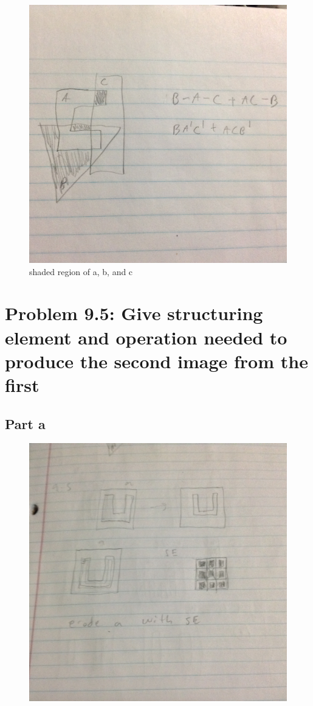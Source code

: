 \documentclass{article}
\begin{document}
	\begin{figure}[H]
		\includegraphics[width=\linewidth]{2.23/fig5.JPG}
		\caption{shaded region of a, b, and c}
	\end{figure}
	
	\newpage
	\section{Problem 9.5: Give structuring element and operation needed to produce the second image from the first}
	\subsection{Part a}
	\begin{figure}[H]
		\includegraphics[width=\linewidth]{9.5/fig1.JPG}
	\end{figure}
\end{document}
